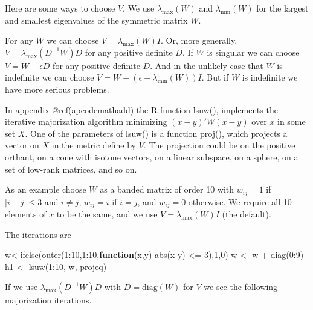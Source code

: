 \documentclass[
  12pt,
  letterpaper,
  DIV=11,
  numbers=noendperiod]{scrreprt}
\newenvironment{Shaded}{\begin{snugshade}}{\end{snugshade}}
\newcommand{\ControlFlowTok}[1]{\textcolor[rgb]{0.00,0.23,0.31}{\textbf{#1}}}
\newcommand{\DecValTok}[1]{\textcolor[rgb]{0.68,0.00,0.00}{#1}}
\newcommand{\FunctionTok}[1]{\textcolor[rgb]{0.28,0.35,0.67}{#1}}
\newcommand{\NormalTok}[1]{\textcolor[rgb]{0.00,0.23,0.31}{#1}}
\newcommand{\OtherTok}[1]{\textcolor[rgb]{0.00,0.23,0.31}{#1}}
\newcommand{\SpecialCharTok}[1]{\textcolor[rgb]{0.37,0.37,0.37}{#1}}
\theoremstyle{remark}
\begin{document}
Here are some ways to choose \(V\). We use \(\lambda_{\text{max}}(W)\)
and \(\lambda_{\text{min}}(W)\) for the largest and smallest eigenvalues
of the symmetric matrix \(W\).

For any \(W\) we can choose \(V=\lambda_{\text{max}}(W)I\). Or, more
generally, \(V=\lambda_{\text{max}}(D^{-1}W)D\) for any positive
definite \(D\). If \(W\) is singular we can choose \(V=W+\epsilon D\)
for any positive definite \(D\). And in the unlikely case that \(W\) is
indefinite we can choose \(V=W+(\epsilon-\lambda_{\text{min}}(W))I\).
But if \(W\) is indefinite we have more serious problems.

In appendix @ref(apcodemathadd) the R function lsuw(), implements the
iterative majorization algorithm minimizing \((x-y)'W(x-y)\) over \(x\)
in some set \(X\). One of the parameters of lsuw() is a function proj(),
which projects a vector on \(X\) in the metric define by \(V\). The
projection could be on the positive orthant, on a cone with isotone
vectors, on a linear subspace, on a sphere, on a set of low-rank
matrices, and so on.

As an example choose \(W\) as a banded matrix of order 10 with
\(w_{ij}=1\) if \(|i-j|\leq 3\) and \(i\not= j\), \(w_{ij}=i\) if
\(i=j\), and \(w_{ij}=0\) otherwise. We require all 10 elements of \(x\)
to be the same, and we use \(V=\lambda_{\text{max}}(W)I\) (the default).

The iterations are

\begin{Shaded}
\begin{Highlighting}[]
\NormalTok{w}\OtherTok{\textless{}{-}}\FunctionTok{ifelse}\NormalTok{(}\FunctionTok{outer}\NormalTok{(}\DecValTok{1}\SpecialCharTok{:}\DecValTok{10}\NormalTok{,}\DecValTok{1}\SpecialCharTok{:}\DecValTok{10}\NormalTok{,}\ControlFlowTok{function}\NormalTok{(x,y) }\FunctionTok{abs}\NormalTok{(x}\SpecialCharTok{{-}}\NormalTok{y) }\SpecialCharTok{\textless{}=} \DecValTok{3}\NormalTok{),}\DecValTok{1}\NormalTok{,}\DecValTok{0}\NormalTok{)}
\NormalTok{w }\OtherTok{\textless{}{-}}\NormalTok{ w }\SpecialCharTok{+} \FunctionTok{diag}\NormalTok{(}\DecValTok{0}\SpecialCharTok{:}\DecValTok{9}\NormalTok{)}
\NormalTok{h1 }\OtherTok{\textless{}{-}} \FunctionTok{lsuw}\NormalTok{(}\DecValTok{1}\SpecialCharTok{:}\DecValTok{10}\NormalTok{, w, projeq)}
\end{Highlighting}
\end{Shaded}

If we use \(\lambda_{\text{max}}(D^{-1}W)D\) with \(D=\text{diag}(W)\)
for \(V\) we see the following majorization iterations.
\end{document}
